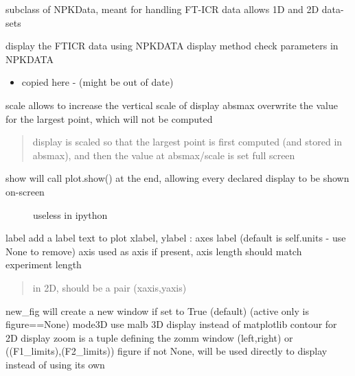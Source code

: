 \documentclass[letterpaper,10pt,openany,oneside]{sphinxmanual}
\begin{document}

\begin{fulllineitems}
\label{rst/code:FTICR.FTICRData}
subclass of NPKData, meant for handling FT-ICR data
allows 1D and 2D data-sets

\begin{fulllineitems}
\label{rst/code:FTICR.FTICRData.display}
display the FTICR data using NPKDATA display method
check parameters in NPKDATA
\begin{itemize}
\item {} 
copied here - (might be out of date)

\end{itemize}

scale   allows to increase the vertical scale of display
absmax  overwrite the value for the largest point, which will not be computed
\begin{quote}

display is scaled so that the largest point is first computed (and stored in absmax),
and then the value at absmax/scale is set full screen
\end{quote}
\begin{description}
\item[{show    will call plot.show() at the end, allowing every declared display to be shown on-screen}] \leavevmode
useless in ipython

\end{description}

label   add a label text to plot
xlabel, ylabel : axes label (default is self.units - use None to remove)
axis    used as axis if present, axis length should match experiment length
\begin{quote}

in 2D, should be a pair (xaxis,yaxis)
\end{quote}

new\_fig will create a new window if set to True (default) (active only is figure==None)
mode3D  use malb 3D display instead of matplotlib contour for 2D display
zoom    is a tuple defining the zomm window (left,right) or   ((F1\_limits),(F2\_limits))
figure  if not None, will be used directly to display instead of using its own


\end{fulllineitems}
\end{fulllineitems}
\end{document}
